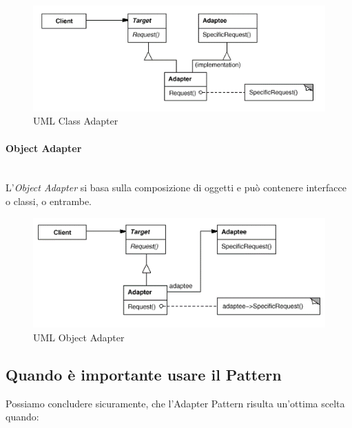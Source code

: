     \begin{figure}[htbp]
      \begin{center}
        \includegraphics[width=12cm]{img/umls/class_adapter.png}
      \end{center}
      \caption{UML Class Adapter}
      \label{fig:dessin}
    \end{figure}
    
    \paragraph{Object Adapter} \hfill \\
    L’\emph{Object Adapter} si basa sulla composizione di oggetti e può 
    contenere interfacce o classi, o entrambe.
    
    \begin{figure}[htbp]
      \begin{center}
        \includegraphics[width=12cm]{img/umls/object_adapter.png}
      \end{center}
      \caption{UML Object Adapter}
      \label{fig:dessin}
    \end{figure}
    
    \subsection{Quando è importante usare il Pattern}
    Possiamo concludere sicuramente, che l'Adapter Pattern risulta un'ottima
    scelta quando:
    
